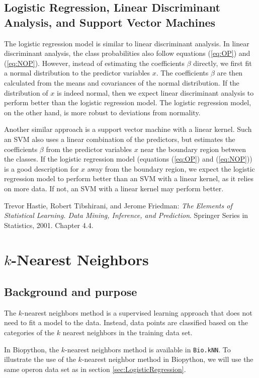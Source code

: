 \documentclass{report}
\begin{document}
\subsection{Logistic Regression, Linear Discriminant Analysis, and Support Vector Machines}

The logistic regression model is similar to linear discriminant analysis. In linear discriminant analysis, the class probabilities also follow equations (\ref{eq:OP}) and (\ref{eq:NOP}). However, instead of estimating the coefficients $\beta$ directly, we first fit a normal distribution to the predictor variables $x$. The coefficients $\beta$ are then calculated from the means and covariances of the normal distribution. If the distribution of $x$ is indeed normal, then we expect linear discriminant analysis to perform better than the logistic regression model. The logistic regression model, on the other hand, is more robust to deviations from normality.

Another similar approach is a support vector machine with a linear kernel. Such an SVM also uses a linear combination of the predictors, but estimates the coefficients $\beta$ from the predictor variables $x$ near the boundary region between the classes. If the logistic regression model (equations (\ref{eq:OP}) and (\ref{eq:NOP})) is a good description for $x$ away from the boundary region, we expect the logistic regression model to perform better than an SVM with a linear kernel, as it relies on more data. If not, an SVM with a linear kernel may perform better.

Trevor Hastie, Robert Tibshirani, and Jerome Friedman: {\it The Elements of Statistical Learning. Data Mining, Inference, and Prediction}. Springer Series in Statistics, 2001. Chapter 4.4.

\section{$k$-Nearest Neighbors}

\subsection{Background and purpose}

The $k$-nearest neighbors method is a supervised learning approach that does not need to fit a model to the data. Instead, data points are classified based on the categories of the $k$ nearest neighbors in the training data set.

In Biopython, the $k$-nearest neighbors method is available in \verb+Bio.kNN+. To illustrate the use of the $k$-nearest neighbor method in Biopython, we will use the same operon data set as in section \ref{sec:LogisticRegression}.
\end{document}
